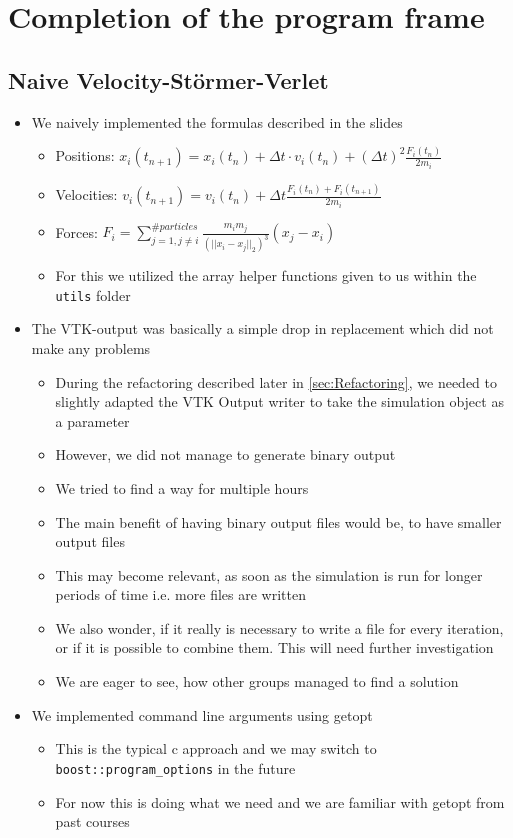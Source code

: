\documentclass{article}
\begin{document}
\section{Completion of the program frame}

\subsection{Naive Velocity-Störmer-Verlet}
\begin{itemize}
    \item We naively implemented the formulas described in the slides
    \begin{itemize}
        \item Positions: $x_i(t_{n+1}) = x_i(t_{n}) + \Delta t \cdot v_i(t_n) + (\Delta t )^2 \frac{F_i(t_n)}{2m_i}$
        \item Velocities: $v_i(t_{n+1}) = v_i(t_n) + \Delta t \frac{F_i(t_n) + F_i(t_{n+1})}{2m_i}$
        \item Forces: $F_i = \sum_{j=1, j \neq i}^{\#particles}
        \frac{m_im_j}{(||x_i-x_j||_2)^3} (x_j - x_i) $
        \item For this we utilized the array helper functions given to us within the \verb|utils| folder
    \end{itemize}
    \item The VTK-output was basically a simple drop in replacement which did not make any problems
    \begin{itemize}
        \item During the refactoring described later in \ref{sec:Refactoring}, we needed to slightly adapted the VTK Output writer to take the simulation object as a parameter
        \item However, we did not manage to generate binary output
        \item We tried to find a way for multiple hours
        \item The main benefit of having binary output files would be, to have smaller output files
        \item This may become relevant, as soon as the simulation is run for longer periods of time i.e. more files are written
        \item We also wonder, if it really is necessary to write a file for every iteration, or if it is possible to combine them. This will need further investigation
        \item We are eager to see, how other groups managed to find a solution
    \end{itemize}
    \item We implemented command line arguments using getopt
    \begin{itemize}
        \item This is the typical c approach and we may switch to \verb|boost::program_options| in the future
        \item For now this is doing what we need and we are familiar with getopt from past courses
    \end{itemize}
\end{itemize}
\end{document}
